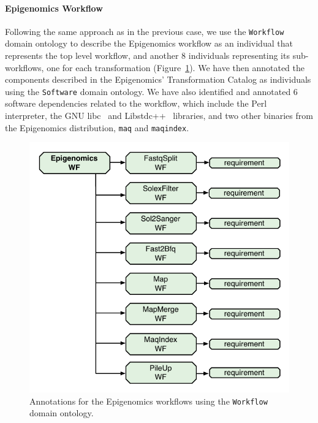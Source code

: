\paragraph{\textbf{Epigenomics Workflow}}
Following the same approach as in the previous case, we use the \texttt{Workflow} 
domain ontology to describe the Epigenomics workflow as an individual that represents 
the top level workflow, and another 8 individuals representing its sub-workflows, one 
for each transformation (Figure~\ref{fig:annotations-genome}). We have then annotated 
the components described in the Epigenomics' Transformation Catalog as individuals 
using the \texttt{Software} domain ontology. We have also identified and annotated 6 
software dependencies related to the workflow, which include the Perl~\cite{perl} interpreter, 
the GNU libc~\cite{libc} and Libstdc++~\cite{libstdc} libraries, and two other binaries from 
the Epigenomics  distribution, \texttt{maq} and \texttt{maqindex}.

\begin{figure}[!htb]
	\centering
	\includegraphics[width=.7\linewidth]{figures/annotations-genome}
	\vspace{-10pt}
	\caption{Annotations for the Epigenomics workflows using the \texttt{Workflow} domain ontology.}
	\label{fig:annotations-genome}
\end{figure}


